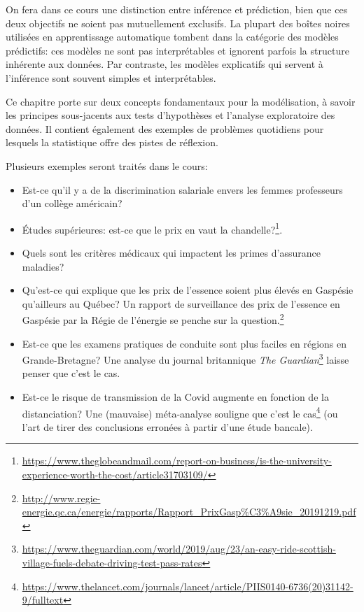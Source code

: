 \documentclass[
  11pt,
  letterpaper,
]{book}
\providecommand{\tightlist}{%
  \setlength{\itemsep}{0pt}\setlength{\parskip}{0pt}}
\renewcommand{\href}[2]{#2\footnote{\url{#1}}}
\begin{document}
On fera dans ce cours une distinction entre inférence et prédiction, bien que ces deux objectifs ne soient pas mutuellement exclusifs. La plupart des boîtes noires utilisées en apprentissage automatique tombent dans la catégorie des modèles prédictifs: ces modèles ne sont pas interprétables et ignorent parfois la structure inhérente aux données. Par contraste, les modèles explicatifs qui servent à l'inférence sont souvent simples et interprétables.

Ce chapitre porte sur deux concepts fondamentaux pour la modélisation, à savoir les principes sous-jacents aux tests d'hypothèses et l'analyse exploratoire des données. Il contient également des exemples de problèmes quotidiens pour lesquels la statistique offre des pistes de réflexion.

Plusieurs exemples seront traités dans le cours:

\begin{itemize}
\tightlist
\item
  Est-ce qu'il y a de la discrimination salariale envers les femmes professeurs d'un collège américain?
\item
  Études supérieures: \href{https://www.theglobeandmail.com/report-on-business/is-the-university-experience-worth-the-cost/article31703109/}{est-ce que le prix en vaut la chandelle?}.
\item
  Quels sont les critères médicaux qui impactent les primes d'assurance maladies?
\item
  Qu'est-ce qui explique que les prix de l'essence soient plus élevés en Gaspésie qu'ailleurs au Québec? \href{http://www.regie-energie.qc.ca/energie/rapports/Rapport_PrixGasp\%C3\%A9sie_20191219.pdf}{Un rapport de surveillance des prix de l'essence en Gaspésie par la Régie de l'énergie se penche sur la question.}
\item
  Est-ce que les examens pratiques de conduite sont plus faciles en régions en Grande-Bretagne? \href{https://www.theguardian.com/world/2019/aug/23/an-easy-ride-scottish-village-fuels-debate-driving-test-pass-rates}{Une analyse du journal britannique \emph{The Guardian}} laisse penser que c'est le cas.
\item
  Est-ce le risque de transmission de la Covid augmente en fonction de la distanciation? \href{https://www.thelancet.com/journals/lancet/article/PIIS0140-6736(20)31142-9/fulltext}{Une (mauvaise) méta-analyse souligne que c'est le cas} (ou l'art de tirer des conclusions erronées à partir d'une étude bancale).
\end{itemize}
\end{document}

